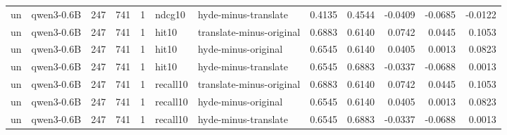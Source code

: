 \begin{tabular}{llrrrllrrrrr}
un & qwen3-0.6B & 247 & 741 & 1 & ndcg10 & hyde-minus-translate & 0.4135 & 0.4544 & -0.0409 & -0.0685 & -0.0122 \\
un & qwen3-0.6B & 247 & 741 & 1 & hit10 & translate-minus-original & 0.6883 & 0.6140 & 0.0742 & 0.0445 & 0.1053 \\
un & qwen3-0.6B & 247 & 741 & 1 & hit10 & hyde-minus-original & 0.6545 & 0.6140 & 0.0405 & 0.0013 & 0.0823 \\
un & qwen3-0.6B & 247 & 741 & 1 & hit10 & hyde-minus-translate & 0.6545 & 0.6883 & -0.0337 & -0.0688 & 0.0013 \\
un & qwen3-0.6B & 247 & 741 & 1 & recall10 & translate-minus-original & 0.6883 & 0.6140 & 0.0742 & 0.0445 & 0.1053 \\
un & qwen3-0.6B & 247 & 741 & 1 & recall10 & hyde-minus-original & 0.6545 & 0.6140 & 0.0405 & 0.0013 & 0.0823 \\
un & qwen3-0.6B & 247 & 741 & 1 & recall10 & hyde-minus-translate & 0.6545 & 0.6883 & -0.0337 & -0.0688 & 0.0013 \\
\bottomrule
\end{tabular}
